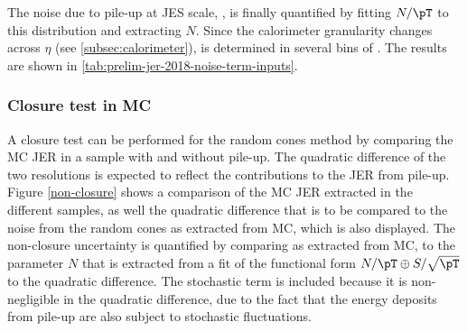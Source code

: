 The noise due to pile-up at JES scale, \Npileup, is finally quantified by fitting $N/\pT$ to this distribution and extracting $N$.
Since the calorimeter granularity changes across $\eta$ (see \cref{subsec:calorimeter}), \Npileup is determined in several bins of \absetadet. 
The results are shown in \cref{tab:prelim-jer-2018-noise-term-inputs}.





\subsubsection{Closure test in MC}
A closure test can be performed for the random cones method by comparing the MC JER in a sample with and without pile-up. The quadratic difference of the two resolutions is expected to reflect the contributions to the JER from pile-up. Figure \cref{non-closure} shows a comparison of the MC JER extracted in the different samples, as well the quadratic difference that is to be compared to the noise from the random cones as extracted from MC, which is also displayed. The non-closure uncertainty is quantified by comparing \Npileup as extracted from MC, to the parameter $N$ that is extracted from a fit of the functional form $N/\pT \oplus S/\sqrt{\pT}$ to the quadratic difference. The stochastic term is included because it is non-negligible in the quadratic difference, due to the fact that the energy deposits from pile-up are also subject to stochastic fluctuations.

